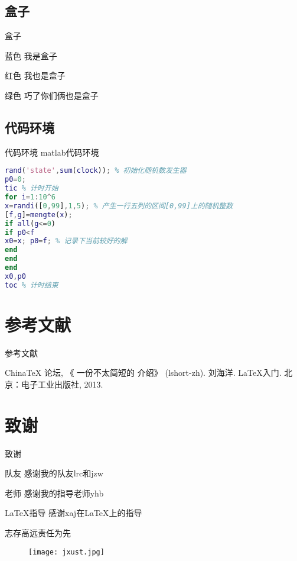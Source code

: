 \documentclass{jxustbeamer}
\begin{document}
\subsection{盒子}
\begin{frame}{盒子}
	\begin{block}{蓝色}
		我是盒子
	\end{block}

    \begin{alertblock}{红色}
    	我也是盒子
    \end{alertblock}

    \begin{exampleblock}{绿色}
    	巧了你们俩也是盒子
    \end{exampleblock}
\end{frame}

\subsection{代码环境}
\begin{frame}[fragile]{代码环境}
	matlab代码环境
\begin{lstlisting}[language=matlab]
rand('state',sum(clock)); % 初始化随机数发生器
p0=0;
tic % 计时开始
for i=1:10^6
x=randi([0,99],1,5); % 产生一行五列的区间[0,99]上的随机整数
[f,g]=mengte(x);
if all(g<=0)
if p0<f
x0=x; p0=f; % 记录下当前较好的解
end
end
end
x0,p0
toc % 计时结束
\end{lstlisting}
\end{frame}
\section{参考文献}
\begin{frame}{参考文献}
	\begin{thebibliography}{99}
		 China\TeX{} 论坛, 《 一份不太简短的 \LaTeXe{} 介绍》 (lshort-zh).
		 刘海洋. LaTeX入门. 北京：电子工业出版社, 2013.
	\end{thebibliography}
\end{frame}
\section{致谢}
\begin{frame}{致谢}
    \begin{block}{队友}
    	\centering
    	感谢我的队友lrc和jzw
    \end{block}
    \pause
    \begin{block}{老师}
    	\centering
    	感谢我的指导老师yhb
    \end{block}
    \pause
    \begin{block}{\LaTeX{}指导}
    	\centering
    	感谢xaj在\LaTeX{}上的指导
    \end{block}
    \pause
	\begin{center}
		志存高远\hspace{1pc}责任为先
	\end{center}
    \pause
    \begin{figure}[h]
    	\centering
    	\texttt{[image: jxust.jpg]}
    \end{figure}
\end{frame}
\end{document}
